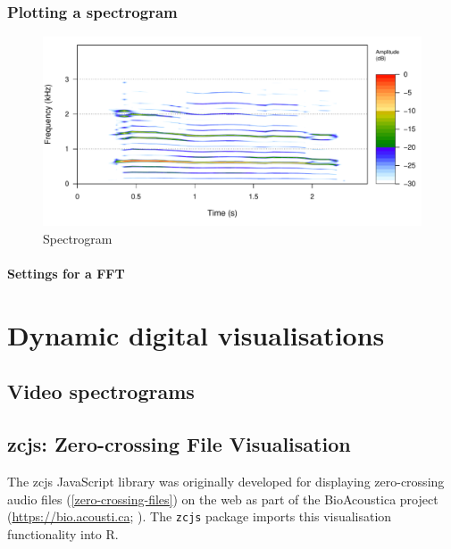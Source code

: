 \documentclass[
]{book}
\begin{document}
\hypertarget{plotting-a-spectrogram}{%
\subsection{Plotting a spectrogram}\label{plotting-a-spectrogram}}

\begin{figure}

{\centering \includegraphics[width=0.9\linewidth]{_main_files/figure-latex/spectrogram-1} 

}

\caption{Spectrogram}\label{fig:spectrogram}
\end{figure}

\hypertarget{settings-for-a-fft}{%
\subsubsection{Settings for a FFT}\label{settings-for-a-fft}}

\hypertarget{dynamic-digital-visualisations}{%
\chapter{Dynamic digital visualisations}\label{dynamic-digital-visualisations}}

\hypertarget{video-spectrograms}{%
\section{Video spectrograms}\label{video-spectrograms}}

\hypertarget{zcjs-zero-crossing-file-visualisation}{%
\section{zcjs: Zero-crossing File Visualisation}\label{zcjs-zero-crossing-file-visualisation}}

The zcjs JavaScript library was originally developed for displaying zero-crossing audio files (\ref{zero-crossing-files}) on the web as part of the BioAcoustica project (\url{https://bio.acousti.ca}; \citet{baker2015bioacoustica}). The \texttt{zcjs} package \citep{zcjsr} imports this visualisation functionality into R.
\end{document}
